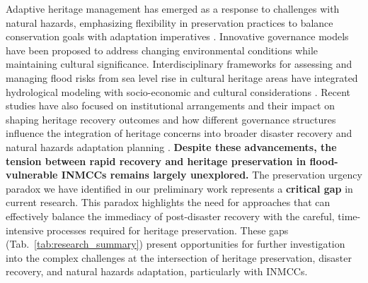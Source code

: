 \documentclass[11pt]{article}
\begin{document}
Adaptive heritage management has emerged as a response to challenges with natural hazards, emphasizing flexibility in preservation practices to balance conservation goals with adaptation imperatives \cite{fatoric2023towards}. 
Innovative governance models have been proposed to address changing environmental conditions while maintaining cultural significance.
Interdisciplinary frameworks for assessing and managing flood risks from sea level rise in cultural heritage areas have integrated hydrological modeling with socio-economic and cultural considerations \cite{vojinovic2016holistic}. 
Recent studies have also focused on institutional arrangements and their impact on shaping heritage recovery outcomes and how different governance structures influence the integration of heritage concerns into broader disaster recovery and natural hazards adaptation planning \cite{castro2021community}.
\textbf{Despite these advancements, the tension between rapid recovery and heritage preservation in flood-vulnerable INMCCs remains largely unexplored.} 
The preservation urgency paradox we have identified in our preliminary work represents a \textbf{critical gap }in current research. 
This paradox highlights the need for approaches that can effectively balance the immediacy of post-disaster recovery with the careful, time-intensive processes required for heritage preservation.
These gaps (Tab.~\ref{tab:research_summary}) present opportunities for further investigation into the complex challenges at the intersection of heritage preservation, disaster recovery, and natural hazards adaptation, particularly with INMCCs. 
\end{document}
